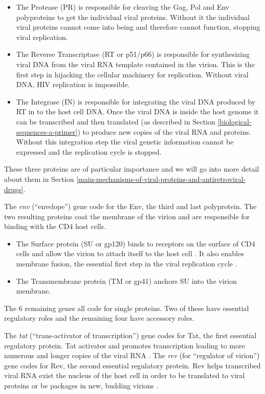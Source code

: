 \documentclass[
  11pt,
  twoside]{scrbook}
\begin{document}
\begin{itemize}
\item
  The Protease (PR) is responsible for cleaving the Gag, Pol and Env polyproteins to get the individual viral proteins. Without it the individual viral proteins cannot come into being and therefore cannot function, stopping viral replication.
\item
  The Reverse Transcriptase (RT or p51/p66) is responsible for synthesizing viral DNA from the viral RNA template contained in the virion. This is the first step in hijacking the cellular machinery for replication. Without viral DNA, HIV replication is impossible.
\item
  The Integrase (IN) is responsible for integrating the viral DNA produced by RT in to the host cell DNA. Once the viral DNA is inside the host genome it can be transcribed and then translated (as described in Section \ref{biological-sequences-a-primer}) to produce new copies of the viral RNA and proteins. Without this integration step the viral genetic information cannot be expressed and the replication cycle is stopped.
\end{itemize}

These three proteins are of particular importance and we will go into more detail about them in Section \ref{main-mechanisms-of-viral-proteins-and-antiretroviral-drugs}.

The \emph{env} (``envelope'') gene code for the Env, the third and last polyprotein. The two resulting proteins coat the membrane of the virion and are responsible for binding with the CD4 host cells.

\begin{itemize}
\item
  The Surface protein (SU or gp120) binds to receptors on the surface of CD4 cells and allow the virion to attach itself to the host cell \autocite{bourHumanImmunodeficiencyVirus1995}. It also enables membrane fusion, the essential first step in the viral replication cycle \autocite{hernandezViruscellCellcellFusion1996}.
\item
  The Transmembrane protein (TM or gp41) anchors SU into the virion membrane.
\end{itemize}

The 6 remaining genes all code for single proteins. Two of these have essential regulatory roles and the remaining four have accessory roles.

The \emph{tat} (``trans-activator of transcription'') gene codes for Tat, the first essential regulatory protein. Tat activates and promotes transcription leading to more numerous and longer copies of the viral RNA \autocite{jonesControlRnaInitiation1994}. The \emph{rev} (for ``regulator of virion'') gene codes for Rev, the second essential regulatory protein. Rev helps transcribed viral RNA exist the nucleus of the host cell in order to be translated to viral proteins or be packages in new, budding virions \autocite{hopeViralRNAExport1997}.
\end{document}
